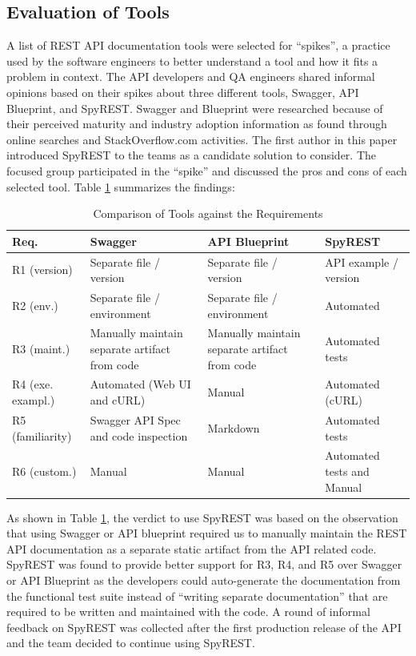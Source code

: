 \documentclass[10pt, conference]{IEEEtran}
\begin{document}
\subsection{Evaluation of Tools}
A list of REST API documentation tools were selected for ``spikes'', a practice used by the software engineers to better understand a tool and how it fits a problem in context. The API developers and QA engineers shared informal opinions based on their spikes about three different tools, Swagger, API Blueprint, and SpyREST. Swagger and Blueprint were researched because of their perceived maturity and industry adoption information as found through online searches and StackOverflow.com activities. The first author in this paper introduced SpyREST to the teams as a candidate solution to consider. The focused group participated in the ``spike'' and discussed the pros and cons of each selected tool. Table \ref{table:compare} summarizes the findings:

\begin{table}[!tbh]
\caption{Comparison of Tools against the Requirements}
  \label{table:compare}
\begin{tabular}{|p{0.5in} | p{0.8in}| p{0.8in}|p{0.8in}|}

\hline
\textbf{Req}. & \textbf{Swagger} & \textbf{API Blueprint} & \textbf{SpyREST} \\
\hline
R1 (version) & Separate file / version & Separate file / version & API example / version \\
\hline
R2 (env.)& Separate file / environment & Separate file / environment & Automated \\
\hline
R3 (maint.)& Manually maintain separate artifact from code & Manually maintain separate artifact from code & Automated tests \\
\hline
R4 (exe. exampl.)& Automated (Web UI and cURL) & Manual & Automated (cURL) \\
\hline
R5 (familiarity)& Swagger API Spec and code inspection & Markdown & Automated tests \\
\hline
R6 (custom.)& Manual & Manual & Automated tests and Manual \\
\hline
\end{tabular}
\end{table}

As shown in Table \ref{table:compare}, the verdict to use SpyREST was based on the observation that using Swagger or API blueprint required us to manually maintain the REST API documentation as a separate static artifact from the API related code. SpyREST was found to provide better support for R3, R4, and R5 over Swagger or API Blueprint as the developers could auto-generate the documentation from the functional test suite instead of ``writing separate documentation'' that are required to be written and maintained with the code. A round of informal feedback on SpyREST was collected after the first production release of the API and the team decided to continue using SpyREST.
\end{document}
